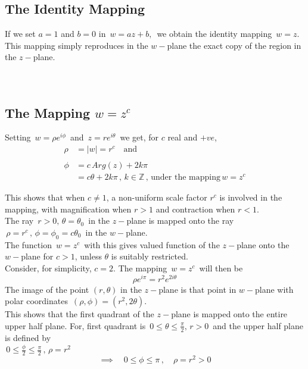 \documentclass[11pt,a4paper]{article}
\theoremstyle{definition}
\begin{document}
{\color[wave]{485}\subsection{The Identity Mapping}}
If we set $a = 1$ and $b = 0$ in $\, w = az + b, \,$ we obtain the identity  mapping $\, w = z$.\\
This mapping simply reproduces in the $w-$plane the exact copy of the region in the $z-$plane.\\\\\\






{\color[wave]{485}\subsection{The Mapping $w = z^c$}}
Setting $\, w = \rho e^{i\phi}\,$ and $\, z =re^{i\theta}\,$ we get, for $c$ real and $+ve$, 
\begin{align*}
\rho & = \left|w\right| = r^c \quad  \text{and}\\\\
\phi & = c \, Arg(z) + 2k\pi\\
& = c\theta + 2k\pi\,,\, k\in \mathbb{Z}\,, \, \text{under the mapping}\, w = z^c
\end{align*}


This shows that when $c\neq 1$, a non-uniform scale factor $ r^c$ is involved in the mapping, with magnification when $r> 1$ and contraction when $r < 1$.\\

The ray $\, r> 0, \, \theta  = \theta_0\,$ in the $z-$plane is mapped onto the ray $\, \rho = r^c\,, \, \phi = \phi_0 = c\theta_0\,$ in the $w-$plane.\\
The function $\, w = z^c\,$ with this gives valued function of the $z-$plane onto the $w-$plane for $ c  > 1$, unless $\theta $ is suitably restricted.\\

Consider, for simplicity, $c = 2$. The mapping $\, w = z^c\,$ will then be $$\boxed{\rho e^{i\pi} = r^2 e^{2i\theta}}$$
The image of the point $(r, \theta)$ in the $z-$plane is that point in $w-$plane with polar coordinates $\, (\rho, \phi) = (r^2, 2\theta)$.\\

This shows that the first quadrant of the $z-$plane is mapped onto the entire upper half plane. For, first quadrant is $\, 0 \leq \theta \leq \frac{\pi}{2}, \, r> 0\,$ and the upper half plane is defined by\\ $\, 0 \leq \frac{\phi}{2}\leq \frac{\pi}{2}\,, \, \rho = r^2 $  $$\implies \quad  0 \leq \phi \leq \pi\,, \quad  \rho = r^2 > 0$$
\end{document}
